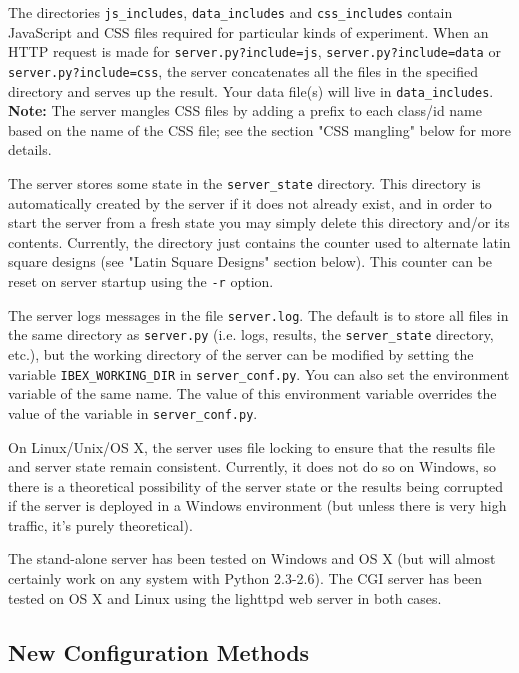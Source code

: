 \documentclass[
]{article}
\begin{document}
The directories \texttt{js\_includes}, \texttt{data\_includes} and
\texttt{css\_includes} contain JavaScript and CSS files required for
particular kinds of experiment. When an HTTP request is made for
\texttt{server.py?include=js}, \texttt{server.py?include=data} or
\texttt{server.py?include=css}, the server concatenates all the files in
the specified directory and serves up the result. Your data file(s) will
live in \texttt{data\_includes}. \textbf{Note:} The server mangles CSS
files by adding a prefix to each class/id name based on the name of the
CSS file; see the section "CSS mangling" below for more details.

The server stores some state in the \texttt{server\_state} directory.
This directory is automatically created by the server if it does not
already exist, and in order to start the server from a fresh state you
may simply delete this directory and/or its contents. Currently, the
directory just contains the counter used to alternate latin square
designs (see "Latin Square Designs" section below). This counter can be
reset on server startup using the \texttt{-r} option.

The server logs messages in the file \texttt{server.log}. The default is
to store all files in the same directory as \texttt{server.py} (i.e.
logs, results, the \texttt{server\_state} directory, etc.), but the
working directory of the server can be modified by setting the variable
\texttt{IBEX\_WORKING\_DIR} in \texttt{server\_conf.py}. You can also
set the environment variable of the same name. The value of this
environment variable overrides the value of the variable in
\texttt{server\_conf.py}.

On Linux/Unix/OS X, the server uses file locking to ensure that the
results file and server state remain consistent. Currently, it does not
do so on Windows, so there is a theoretical possibility of the server
state or the results being corrupted if the server is deployed in a
Windows environment (but unless there is very high traffic, it's purely
theoretical).

The stand-alone server has been tested on Windows and OS X (but will
almost certainly work on any system with Python 2.3-2.6). The CGI server
has been tested on OS X and Linux using the lighttpd web server in both
cases.

\hypertarget{new-configuration-methods}{%
\subsection{New Configuration Methods}\label{new-configuration-methods}}
\end{document}
